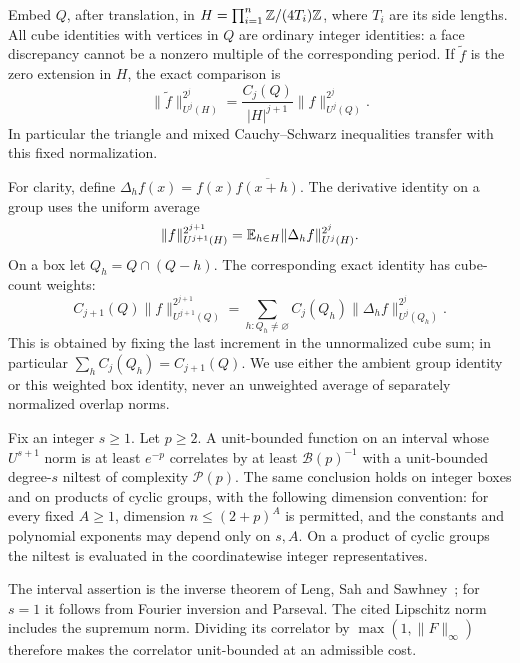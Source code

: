 Embed $Q$, after translation, in
$H=\prod_{i=1}^n\mathbb Z/(4T_i)\mathbb Z$, where $T_i$ are its side lengths.
All cube identities with vertices in $Q$ are ordinary integer
identities: a face discrepancy cannot be a nonzero multiple of the
corresponding period.  If $\widetilde f$ is the zero extension in
$H$, the exact comparison is
\begin{equation}\label{prelim:ambient-gowers}
 \|\widetilde f\|_{U^j(H)}^{2^j}
 =\frac{C_j(Q)}{|H|^{j+1}}\|f\|_{U^j(Q)}^{2^j}.
\end{equation}
In particular the triangle and mixed Cauchy--Schwarz inequalities
transfer with this fixed normalization.

For clarity, define $\Delta_hf(x)=f(x)\overline{f(x+h)}$.
The derivative identity on a group uses the uniform average
\[
 \|f\|_{U^{j+1}(H)}^{2^{j+1}}
 =\mathbb E_{h\in H}\|\Delta_hf\|_{U^j(H)}^{2^j}.
\]
On a box let $Q_h=Q\cap(Q-h)$.  The corresponding exact identity
has cube-count weights:
\begin{equation}\label{prelim:box-derivative}
 C_{j+1}(Q)\|f\|_{U^{j+1}(Q)}^{2^{j+1}}
 =\sum_{h:Q_h\ne\varnothing}
     C_j(Q_h)\|\Delta_hf\|_{U^j(Q_h)}^{2^j}.
\end{equation}
This is obtained by fixing the last increment in the unnormalized
cube sum; in particular $\sum_hC_j(Q_h)=C_{j+1}(Q)$.
We use either the ambient group identity or this weighted box
identity, never an unweighted average of separately normalized
overlap norms.

\begin{theorem}
\label{prelim:inverse}
Fix an integer $s\ge1$. Let $p\ge2$. A unit-bounded function on an interval
whose $U^{s+1}$ norm is at least $e^{-p}$ correlates by at least
$\mathcal B(p)^{-1}$ with a unit-bounded degree-$s$ niltest of
complexity $\mathcal P(p)$. The same conclusion holds on integer
boxes and on products of cyclic groups, with the following dimension
convention: for every fixed
$A\ge1$, dimension $n\le(2+p)^A$ is permitted, and the constants
and polynomial exponents may depend only on $s,A$. On a product
of cyclic groups the niltest is evaluated in the coordinatewise
integer representatives.
\end{theorem}

The interval assertion is the inverse theorem of Leng, Sah and
Sawhney~\cite[Theorem~1.2]{LSSInverse2024}; for $s=1$ it follows
from Fourier inversion and Parseval. The cited Lipschitz norm
includes the supremum norm. Dividing its correlator by
$\max(1,\|F\|_\infty)$ therefore makes the correlator unit-bounded
at an admissible cost.

